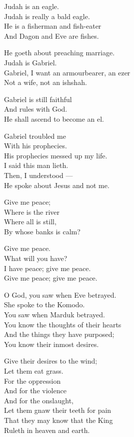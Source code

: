 \documentclass[
]{book}
\begin{document}
Judah is an eagle.\\
Judah is really a bald eagle.\\
He is a fisherman and fish-eater\\
And Dagon and Eve are fishes.

He goeth about preaching marriage.\\
Judah is Gabriel.\\
Gabriel, I want an armourbearer, an ezer\\
Not a wife, not an ishshah.

Gabriel is still faithful\\
And rules with God.\\
He shall ascend to become an el.

Gabriel troubled me\\
With his prophecies.\\
His prophecies messed up my life.\\
I said this man lieth.\\
Then, I understood ---\\
He spoke about Jesus and not me.

Give me peace;\\
Where is the river\\
Where all is still,\\
By whose banks is calm?

Give me peace.\\
What will you have?\\
I have peace; give me peace.\\
Give me peace; give me peace.

O God, you saw when Eve betrayed.\\
She spoke to the Komodo.\\
You saw when Marduk betrayed.\\
You know the thoughts of their hearts\\
And the things they have purposed;\\
You know their inmost desires.

Give their desires to the wind;\\
Let them eat grass.\\
For the oppression\\
And for the violence\\
And for the onslaught,\\
Let them gnaw their teeth for pain\\
That they may know that the King\\
Ruleth in heaven and earth.
\end{document}

